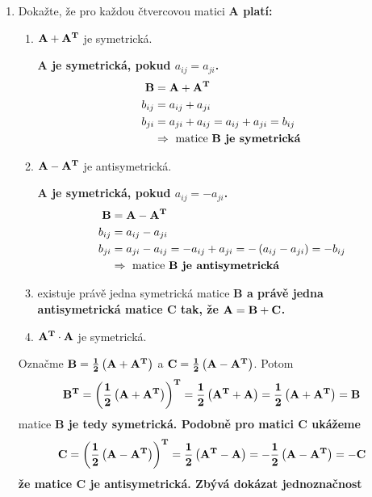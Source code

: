 \begin{enumerate}
    \item Dokažte, že pro každou čtvercovou matici \bf{A} platí:

    \begin{enumerate}
        \item \( \bf{A} + \bf{A}^T \) je symetrická.

        \bf{A} je symetrická, pokud \( a_{ij} = a_{ji} \).
        \begin{align*}
            \bf{B} &= \bf{A} + \bf{A}^T \\
            b_{ij} &= a_{ij} + a_{ji} \\
            b_{ji} &= a_{ji} + a_{ij} = a_{ij} + a_{ji} = b_{ij} \\
            & \Rightarrow \text{ matice \bf{B} je symetrická}
        \end{align*}

        \item \( \bf{A} - \bf{A}^T \) je antisymetrická.

        \bf{A} je symetrická, pokud \( a_{ij} = -a_{ji} \).
        \begin{align*}
            \bf{B} &= \bf{A} - \bf{A}^T \\
            b_{ij} &= a_{ij} - a_{ji} \\
            b_{ji} &= a_{ji} - a_{ij} = -a_{ij} + a_{ji} = -\left( a_{ij} - a_{ji} \right) = -b_{ij} \\
            & \Rightarrow \text{ matice \bf{B} je antisymetrická}
        \end{align*}

        \item existuje právě jedna symetrická matice \bf{B} a právě jedna antisymetrická matice \bf{C} tak, že  \( \bf{A} = \bf{B} + \bf{C} \).
        \item \( \bf{A}^T \cdot \bf{A} \) je symetrická.
    \end{enumerate}

    Označme \( \bf{B} = \frac{1}{2} \left( \bf{A} + \bf{A}^T \right) \) a \( \bf{C} = \frac{1}{2} \left( \bf{A} - \bf{A}^T \right) \). Potom
    \[
        \bf{B}^T = \left( \frac{1}{2} \left( \bf{A} + \bf{A}^T \right) \right)^T = \frac{1}{2} \left( \bf{A}^T + \bf{A} \right) = \frac{1}{2} \left( \bf{A} + \bf{A}^T \right) = \bf{B}
    \]
    matice \bf{B} je tedy symetrická. Podobně pro matici \bf{C} ukážeme
    \[
        \bf{C} = \left( \frac{1}{2} \left( \bf{A} - \bf{A}^T \right) \right)^T = \frac{1}{2} \left( \bf{A}^T - \bf{A} \right) = - \frac{1}{2} \left( \bf{A} - \bf{A}^T \right) = -\bf{C}
    \]
    že matice \bf{C} je antisymetrická. Zbývá dokázat jednoznačnost


\end{enumerate}
